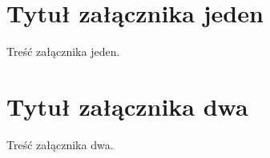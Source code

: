 \documentclass[brudnopis]{xmgr}
\begin{document}
\appendix
\chapter{Tytuł załącznika jeden}

Treść załącznika jeden.

\chapter{Tytuł załącznika dwa}

Treść załącznika dwa.




\listoftables

\listoffigures

\oswiadczenie
\end{document}
